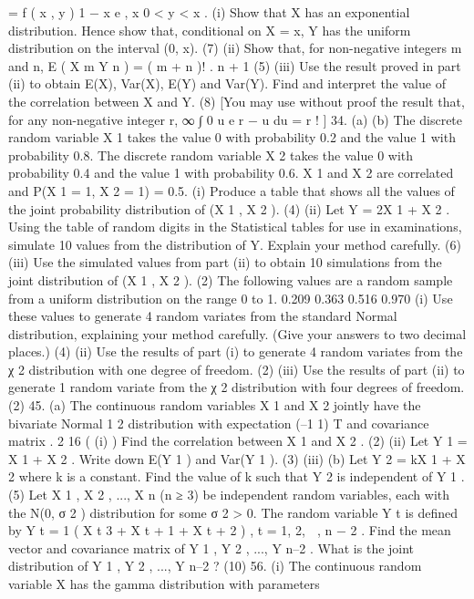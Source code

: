 =
f ( x , y )
1 − x
e ,
x
0 < y < x .
(i) Show that X has an exponential distribution. Hence show that, conditional on
X = x, Y has the uniform distribution on the interval (0, x).
(7)
(ii) Show that, for non-negative integers m and n,
E ( X m Y n ) =
( m + n )!
.
n + 1
(5)
(iii)
Use the result proved in part (ii) to obtain E(X), Var(X), E(Y) and Var(Y). Find
and interpret the value of the correlation between X and Y.
(8)
[You may use without proof the result that, for any non-negative integer r,
∞
∫ 0 u e
r − u
du = r ! ]
34.
(a)
(b)
The discrete random variable X 1 takes the value 0 with probability 0.2 and the
value 1 with probability 0.8. The discrete random variable X 2 takes the value 0
with probability 0.4 and the value 1 with probability 0.6. X 1 and X 2 are
correlated and P(X 1 = 1, X 2 = 1) = 0.5.
(i) Produce a table that shows all the values of the joint probability
distribution of (X 1 , X 2 ).
(4)
(ii) Let Y = 2X 1 + X 2 . Using the table of random digits in the Statistical
tables for use in examinations, simulate 10 values from the distribution
of Y. Explain your method carefully.
(6)
(iii) Use the simulated values from part (ii) to obtain 10 simulations from
the joint distribution of (X 1 , X 2 ).
(2)
The following values are a random sample from a uniform distribution on the
range 0 to 1.
0.209
0.363
0.516
0.970
(i) Use these values to generate 4 random variates from the standard
Normal distribution, explaining your method carefully. (Give your
answers to two decimal places.)
(4)
(ii) Use the results of part (i) to generate 4 random variates from the
χ 2 distribution with one degree of freedom.
(2)
(iii) Use the results of part (ii) to generate 1 random variate from the
χ 2 distribution with four degrees of freedom.
(2)
45.
(a)
The continuous random variables X 1 and X 2 jointly have the bivariate Normal
1 2
distribution with expectation (–1 1) T and covariance matrix
.
2 16
(
(i)
)
Find the correlation between X 1 and X 2 .
(2)
(ii)
Let Y 1 = X 1 + X 2 . Write down E(Y 1 ) and Var(Y 1 ).
(3)
(iii)
(b)
Let Y 2 = kX 1 + X 2 where k is a constant. Find the value of k such that
Y 2 is independent of Y 1 .
(5)
Let X 1 , X 2 , ..., X n (n ≥ 3) be independent random variables, each with the
N(0, σ 2 ) distribution for some σ 2 > 0. The random variable Y t is defined by
Y t =
1
( X t
3
+ X t + 1 + X t + 2 ) , t = 1, 2,  , n − 2 .
Find the mean vector and covariance matrix of Y 1 , Y 2 , ..., Y n–2 . What is the
joint distribution of Y 1 , Y 2 , ..., Y n–2 ?
(10)
56.
(i)
The continuous random variable X has the gamma distribution with parameters
